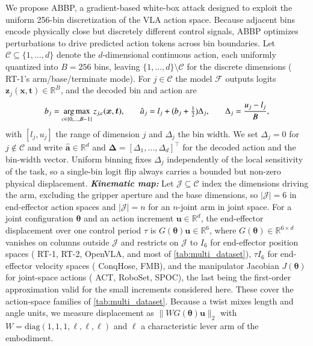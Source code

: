\documentclass[11pt,letterpaper]{article}
\begin{document}
We propose ABBP, a gradient-based white-box attack designed to exploit the uniform 256-bin discretization of the VLA action space. Because adjacent bins encode physically close but discretely different control signals, ABBP optimizes perturbations to drive predicted action tokens across bin boundaries.
Let $\mathcal{C}\subseteq\{1,\dots,d\}$ denote the $d$-dimensional continuous action, each uniformly quantized into $B{=}256$ bins, leaving $\{1,\dots,d\}\setminus\mathcal{C}$ for the discrete dimensions ({\eg} RT-1's arm/base/terminate mode). For $j\in\mathcal{C}$ the model $\mathcal{F}$ outputs logits $\bm{z}_j(\bm{x}, \bm{t})\in\mathbb{R}^{B}$, and the decoded bin and action are 
\vspace{-2.5ex}\begin{equation} 
  \small b_j=\argmax_{c\in\{0,\dots,B-1\}} z_{j,c}(\bm{x}, \bm{t}), \qquad \hat a_j=l_j+\bigl(b_j+\tfrac{1}{2}\bigr)\Delta_j, \qquad \Delta_j=\frac{u_j-l_j}{B}, 
  \label{eq:abbp-quant} 
\vspace{-1.5ex}
\end{equation} 
with $[l_j,u_j]$ the range of dimension $j$ and $\Delta_j$ the bin width. We set $\Delta_j{=}0$ for $j\notin\mathcal{C}$ and write $\hat{\bm{a}}\in\mathbb{R}^{d}$ and $\bm{\Delta}=[\Delta_1,\dots,\Delta_d]^{\top}$ for the decoded action and the bin-width vector. Uniform binning fixes $\Delta_j$ independently of the local sensitivity of the task, so a single-bin logit flip always carries a bounded but non-zero physical displacement. 
{\bf \emph{Kinematic map:}} Let $\mathcal{J}\subseteq\mathcal{C}$ index the dimensions driving the arm, excluding the gripper aperture and the base dimensions, so $|\mathcal{J}|{=}6$ in end-effector action spaces and $|\mathcal{J}|{=}n$ for an $n$-joint arm in joint space. For a joint configuration $\bm{\theta}$ and an action increment $\bm{u}\in\mathbb{R}^{d}$, the end-effector displacement over one control period $\tau$ is $G(\bm{\theta})\bm{u}\in\mathbb{R}^{6}$, where $G(\bm{\theta})\in\mathbb{R}^{6\times d}$ vanishes on columns outside $\mathcal{J}$ and restricts on $\mathcal{J}$ to $I_{6}$ for end-effector position spaces ({\eg} RT-1, RT-2, OpenVLA, and most of \autoref{tab:multi_dataset}), $\tau I_{6}$ for end-effector velocity spaces ({\eg} ConqHose, FMB), and the manipulator Jacobian $J(\bm{\theta})$ for joint-space actions ({\eg} ACT, RoboSet, SPOC), the last being the first-order approximation valid for the small increments considered here. These cover the action-space families of \autoref{tab:multi_dataset}. Because a twist mixes length and angle units, we measure displacement as $\|W G(\bm{\theta})\bm{u}\|_{2}$ with $W=\mathrm{diag}(1,1,1,\ell,\ell,\ell)$ and $\ell$ a characteristic lever arm of the embodiment.
\end{document}
